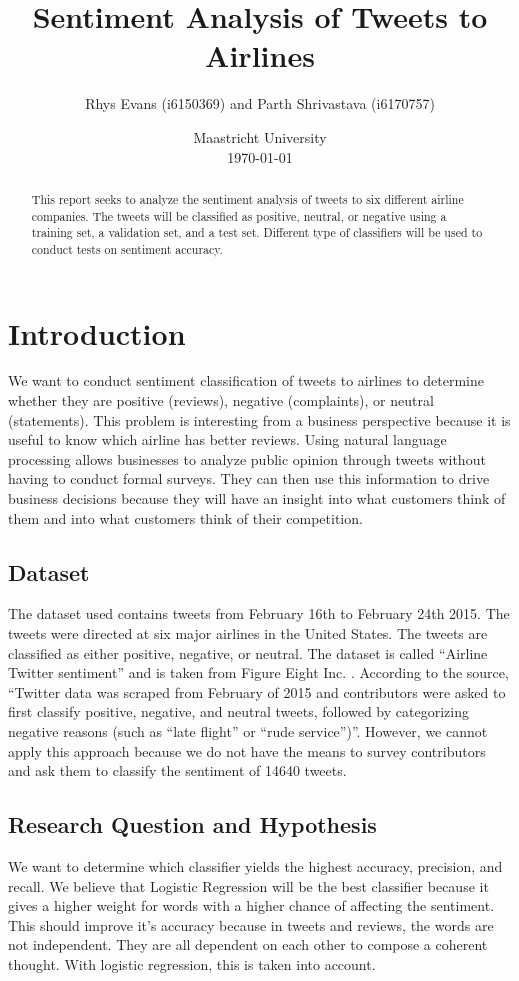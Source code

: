 \documentclass[]{IEEEtran}
\title{Sentiment Analysis of Tweets to Airlines}
\author{Rhys Evans (i6150369) and Parth Shrivastava (i6170757)}
\date{Maastricht University  \\[2ex]
    \today
}
\begin{document}
\maketitle

\begin{abstract}
    This report seeks to analyze the sentiment analysis of tweets to six different airline companies.
    The tweets will be classified as positive, neutral, or negative using a training set, a validation set, and a test set.
    Different type of classifiers will be used to conduct tests on sentiment accuracy.
\end{abstract}

\section{Introduction}
We want to conduct sentiment classification of tweets to airlines to determine
whether they are positive (reviews), negative (complaints), or neutral
(statements). This problem is interesting from a business perspective because it is useful to
know which airline has better reviews. Using natural language processing allows
businesses to analyze public opinion through tweets without having to conduct
formal surveys. They can then use this information to drive business decisions
because they will have an insight into what customers think of them and into what
customers think of their competition.

\subsection{Dataset}
The dataset used contains tweets from February 16th to February 24th 2015. The tweets were directed at six
major airlines in the United States. The tweets are classified as either positive,
negative, or neutral. The dataset is called “Airline Twitter sentiment” and is taken
from Figure Eight Inc. \cite{dataset}. 
According to the source, “Twitter data was scraped from February of 2015
and contributors were asked to first classify positive, negative, and neutral
tweets, followed by categorizing negative reasons (such as “late flight” or “rude
service”)”. However, we cannot apply this approach because we do not have the means to survey
contributors and ask them to classify the sentiment of 14640 tweets.

\subsection{Research Question and Hypothesis}
We want to determine which classifier yields the highest accuracy, precision, and recall. We believe that Logistic Regression will be the best classifier because it gives a higher weight for words with a higher chance of affecting the sentiment. This should improve it's accuracy because in tweets and reviews, the words are not independent. They are all dependent on each other to compose a coherent thought. With logistic regression, this is taken into account.
\end{document}
